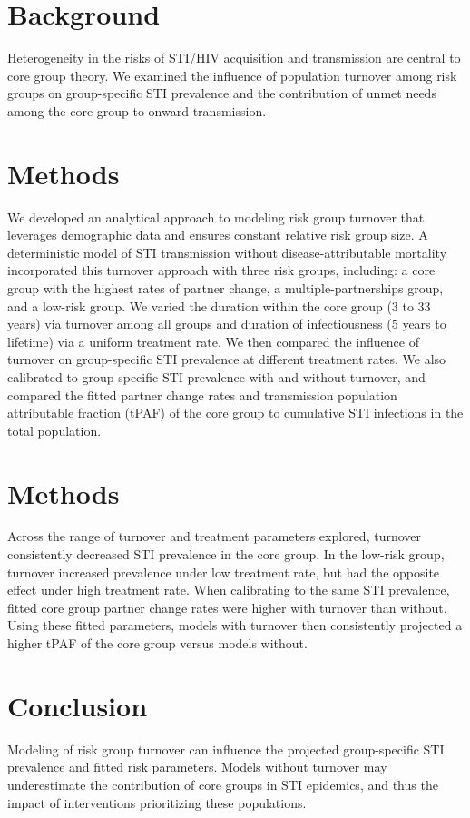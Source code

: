 \section{Background}
Heterogeneity in the risks of STI/HIV acquisition and transmission are central to core group theory. We examined
the influence of population turnover among risk groups on group-specific STI prevalence and the contribution of
unmet needs among the core group to onward transmission.
\section{Methods}
We developed an analytical approach to modeling risk group turnover that leverages demographic data and
ensures constant relative risk group size. A deterministic model of STI transmission without disease-attributable
mortality incorporated this turnover approach with three risk groups, including: a core group with the highest rates
of partner change, a multiple-partnerships group, and a low-risk group. We varied the duration within the core
group (3 to 33 years) via turnover among all groups and duration of infectiousness (5 years to lifetime) via a
uniform treatment rate. We then compared the influence of turnover on group-specific STI prevalence at different
treatment rates. We also calibrated to group-specific STI prevalence with and without turnover, and compared the
fitted partner change rates and transmission population attributable fraction (tPAF) of the core group to cumulative
STI infections in the total population.
\section{Methods}
Across the range of turnover and treatment parameters explored, turnover consistently decreased STI prevalence
in the core group. In the low-risk group, turnover increased prevalence under low treatment rate, but had the
opposite effect under high treatment rate. When calibrating to the same STI prevalence, fitted core group partner
change rates were higher with turnover than without. Using these fitted parameters, models with turnover then
consistently projected a higher tPAF of the core group versus models without.
\section{Conclusion}
Modeling of risk group turnover can influence the projected group-specific STI prevalence and fitted risk
parameters. Models without turnover may underestimate the contribution of core groups in STI epidemics, and
thus the impact of interventions prioritizing these populations.
